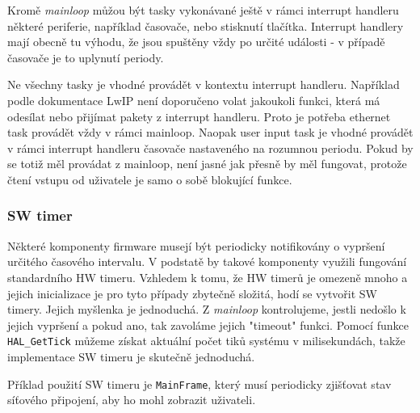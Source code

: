 Kromě \emph{mainloop} můžou být tasky vykonávané ještě v rámci interrupt handleru některé
periferie, například časovače, nebo stisknutí tlačítka.
Interrupt handlery mají obecně tu výhodu, že jsou spuštěny vždy po určité události -
v případě časovače je to uplynutí periody.

Ne všechny tasky je vhodné provádět v kontextu interrupt handleru.
Například podle dokumentace LwIP není doporučeno volat jakoukoli funkci, která má odesílat
nebo přijímat pakety z interrupt handleru.
Proto je potřeba ethernet task provádět vždy v rámci mainloop.
Naopak user input task je vhodné provádět v rámci interrupt handleru časovače nastaveného
na rozumnou periodu.
Pokud by se totiž měl provádat z mainloop, není jasné jak přesně by měl fungovat, protože čtení
vstupu od uživatele je samo o sobě blokující funkce.

\subsubsection{SW timer}
Některé komponenty firmware musejí být periodicky notifikovány o vypršení určitého časového intervalu.
V podstatě by takové komponenty využili fungování standardního HW timeru.
Vzhledem k tomu, že HW timerů je omezeně mnoho a jejich inicializace je pro tyto případy zbytečně složitá,
hodí se vytvořit SW timery.
Jejich myšlenka je jednoduchá.
Z \emph{mainloop} kontrolujeme, jestli nedošlo k jejich vypršení a pokud ano, tak zavoláme jejich
"timeout" funkci.
Pomocí funkce \texttt{HAL_GetTick} můžeme získat aktuální počet tiků systému v milisekundách, takže
implementace SW timeru je skutečně jednoduchá.

Příklad použití SW timeru je \texttt{MainFrame}, který musí periodicky zjišťovat stav síťového
připojení, aby ho mohl zobrazit uživateli.

